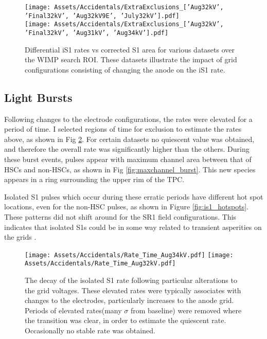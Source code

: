 \begin{figure}
    \centering
    \texttt{[image: Assets/Accidentals/ExtraExclusions\_['Aug32kV', 'Final32kV', 'Aug32kV9E', 'July32kV'].pdf]}\\
       \texttt{[image: Assets/Accidentals/ExtraExclusions\_['Aug32kV', 'Final32kV', 'Aug31kV', 'Aug34kV'].pdf]}
    \caption[Differential iS1 rates vs corrected S1 area for various datasets over the WIMP search ROI.]%
    {Differential iS1 rates vs corrected S1 area for various datasets over the WIMP search ROI.
    These datasets illustrate the impact of grid configurations consisting of changing the anode on the iS1 rate.}
    \label{fig:anode_spectrum}
\end{figure}
\subsection{Light Bursts}

Following changes to the electrode configurations, the rates were elevated for a period of time.
I selected regions of time for exclusion to estimate the rates above, as shown in Fig \ref{fig:decay}.
For certain datasets no quiescent value was obtained, and therefore the overall rate was significantly higher than the others.
During these burst events, pulses appear with maximum channel area between that of HSCs and non-HSCs, as shown in Fig \ref{fig:maxchannel_burst}.
This new species appears in a ring surrounding the upper rim of the TPC.

Isolated S1 pulses which occur during these erratic periods have different hot spot locations, even for the non-HSC pulses, as shown in Figure \ref{fig:is1_hotspots}.
These patterns did not shift around for the SR1 field configurations.
This indicates that isolated S1s could be in some way related to transient asperities on the grids \cite{watson_study_2022}.

\begin{figure}
    \centering
    \texttt{[image: Assets/Accidentals/Rate\_Time\_Aug34kV.pdf]}
    \texttt{[image: Assets/Accidentals/Rate\_Time\_Aug32kV.pdf]}
    \caption[The decay of the isolated S1 rate following  particular alterations to the grid voltages.]%
    {The decay of the isolated S1 rate following  particular alterations to the grid voltages.
    These elevated rates were typically associates with changes to the electrodes, particularly increases to the anode grid.
    Periods of elevated rates(many $\sigma$ from baseline) were removed where the transition was clear, in order to estimate the quiescent rate. 
    Occasionally no stable rate was obtained.}
    \label{fig:decay}
\end{figure}


